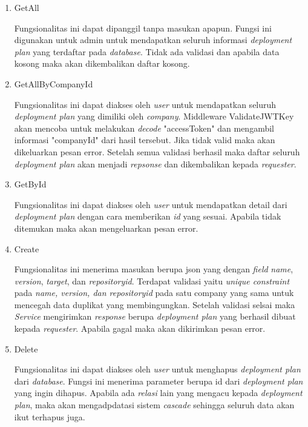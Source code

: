 \begin{enumerate}
  \item GetAll

        Fungsionalitas ini dapat dipanggil tanpa masukan apapun. Fungsi ini digunakan untuk admin untuk mendapatkan seluruh informasi \textit{deployment plan} yang terdaftar pada \textit{database}. Tidak ada validasi dan apabila data kosong maka akan dikembalikan daftar kosong.

  \item GetAllByCompanyId

        Fungsionalitas ini dapat diakses oleh \textit{user} untuk mendapatkan seluruh \textit{deployment plan} yang dimiliki oleh \textit{company}. Middleware ValidateJWTKey akan mencoba untuk melakukan \textit{decode} "accessToken" dan mengambil informasi "companyId" dari hasil tersebut. Jika tidak valid maka akan dikeluarkan pesan error. Setelah semua validasi berhasil maka daftar seluruh \textit{deployment plan} akan menjadi \textit{repsonse} dan dikembalikan kepada \textit{requester}.

  \item GetById

        Fungsionalitas ini dapat diakses oleh \textit{user} untuk mendapatkan detail dari \textit{deployment plan} dengan cara memberikan \textit{id} yang sesuai. Apabila tidak ditemukan maka akan mengeluarkan pesan error.

  \item Create

        Fungsionalitas ini menerima masukan berupa json yang dengan \textit{field} \textit{name}, \textit{version}, \textit{target}, dan \textit{repository\textunderscore id}. Terdapat validasi yaitu \textit{unique constraint} pada \textit{name, version, dan repository\textunderscore id} pada satu company yang sama untuk mencegah data duplikat yang membingungkan. Setelah validasi selsai maka \textit{Service} mengirimkan \textit{response} berupa \textit{deployment plan} yang berhasil dibuat kepada \textit{requester}. Apabila gagal maka akan dikirimkan pesan error.

  \item Delete

        Fungsionalitas ini dapat diakses oleh \textit{user} untuk menghapus \textit{deployment plan} dari \textit{database}. Fungsi ini menerima parameter berupa id dari \textit{deployment plan} yang ingin dihapus. Apabila ada \textit{relasi} lain yang mengacu kepada \textit{deployment plan}, maka akan mengadpdatasi sistem \textit{cascade} sehingga seluruh data akan ikut terhapus juga.


\end{enumerate}
